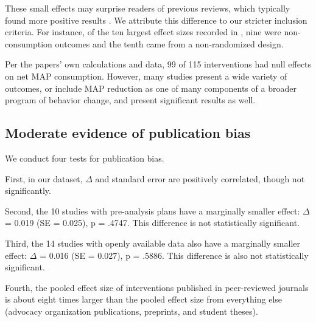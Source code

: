 \documentclass[sn-nature,pdflatex]{sn-jnl}
\begin{document}
These small effects may surprise readers of previous reviews, which
typically found more positive results
\citep{mathur2021meta, meier2022, mertens2022}. We attribute this
difference to our stricter inclusion criteria. For instance, of the ten
largest effect sizes recorded in \citep{mathur2021effectiveness}, nine
were non-consumption outcomes and the tenth came from a non-randomized
design.

Per the papers' own calculations and data, 99 of 115 interventions had
null effects on net MAP consumption. However, many studies present a
wide variety of outcomes, or include MAP reduction as one of many
components of a broader program of behavior change, and present
significant results as well.

\begin{comment}
Using our calculations of effect size and standard error 15 interventions have 95%
\end{comment}

\subsection{Moderate evidence of publication bias}\label{sec2.2}

We conduct four tests for publication bias.

\begin{comment} 
introductory remarks about how this puts our main results in one light or another? 
\end{comment}

First, in our dataset, \(\Delta\) and standard error are positively
correlated, though not significantly.

Second, the 10 studies with pre-analysis plans have a marginally smaller
effect: \(\Delta\) = 0.019 (SE = 0.025), p = .4747. This difference is
not statistically significant.

Third, the 14 studies with openly available data also have a marginally
smaller effect: \(\Delta\) = 0.016 (SE = 0.027), p = .5886. This
difference is also not statistically significant.

Fourth, the pooled effect size of interventions published in
peer-reviewed journals is about eight times larger than the pooled
effect size from everything else (advocacy organization publications,
preprints, and student theses).
\end{document}
